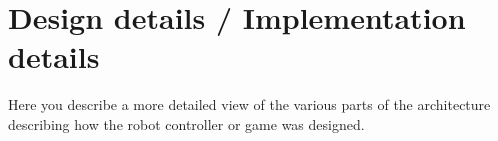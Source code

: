 \chapter{Design details / Implementation details}

Here you describe a more detailed view of the various parts of the 
architecture describing how the robot controller or game was designed.